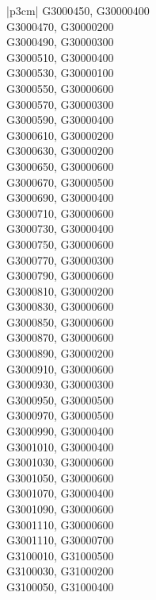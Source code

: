 \begin{customLongTable}{ |p{3cm}| }
G3000450, G30000400 \\ \hline
G3000470, G30000200 \\ \hline
G3000490, G30000300 \\ \hline
G3000510, G30000400 \\ \hline
G3000530, G30000100 \\ \hline
G3000550, G30000600 \\ \hline
G3000570, G30000300 \\ \hline
G3000590, G30000400 \\ \hline
G3000610, G30000200 \\ \hline
G3000630, G30000200 \\ \hline
G3000650, G30000600 \\ \hline
G3000670, G30000500 \\ \hline
G3000690, G30000400 \\ \hline
G3000710, G30000600 \\ \hline
G3000730, G30000400 \\ \hline
G3000750, G30000600 \\ \hline
G3000770, G30000300 \\ \hline
G3000790, G30000600 \\ \hline
G3000810, G30000200 \\ \hline
G3000830, G30000600 \\ \hline
G3000850, G30000600 \\ \hline
G3000870, G30000600 \\ \hline
G3000890, G30000200 \\ \hline
G3000910, G30000600 \\ \hline
G3000930, G30000300 \\ \hline
G3000950, G30000500 \\ \hline
G3000970, G30000500 \\ \hline
G3000990, G30000400 \\ \hline
G3001010, G30000400 \\ \hline
G3001030, G30000600 \\ \hline
G3001050, G30000600 \\ \hline
G3001070, G30000400 \\ \hline
G3001090, G30000600 \\ \hline
G3001110, G30000600 \\ \hline
G3001110, G30000700 \\ \hline
G3100010, G31000500 \\ \hline
G3100030, G31000200 \\ \hline
G3100050, G31000400 \\ \hline

\end{customLongTable}
